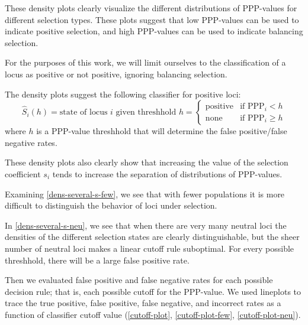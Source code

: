 \documentclass[a4paper,12pt]{article}
\begin{document}



These density plots clearly visualize the different distributions of
PPP-values for different selection types. These plots suggest that low
PPP-values can be used to indicate positive selection, and high
PPP-values can be used to indicate balancing selection.

For the purposes of this work, we will limit ourselves to the
classification of a locus as positive or not positive, ignoring
balancing selection.

The density plots suggest the following classifier for positive loci:
$$\hat{S}_{i}(h)=\text{state of locus $i$ given threshhold $h$} = 
\begin{cases}
  \text{positive} & \text{if PPP}_i<h\\
  \text{none}     & \text{if PPP}_i\geq h
\end{cases}
$$
where $h$ is a PPP-value threshhold that will determine the false
positive/false negative rates.

These density plots also clearly show that increasing the value of the
selection coefficient $s_i$ tends to increase the separation of
distributions of PPP-values.

Examining \autoref{dens-several-s-few}, we see that with fewer
populations it is more difficult to distinguish the behavior of loci
under selection.

In \autoref{dens-several-s-neu}, we see that when there are very many
neutral loci the densities of the different selection states are
clearly distinguishable, but the sheer number of neutral loci makes a
linear cutoff rule suboptimal. For every possible threshhold, there
will be a large false positive rate.

Then we evaluated false positive and false negative rates for each
possible decision rule; that is, each possible cutoff for the
PPP-value. We used lineplots to trace the true positive, false
positive, false negative, and incorrect rates as a function of
classifier cutoff value (\autoref{cutoff-plot},
\autoref{cutoff-plot-few}, \autoref{cutoff-plot-neu}).
\end{document}
